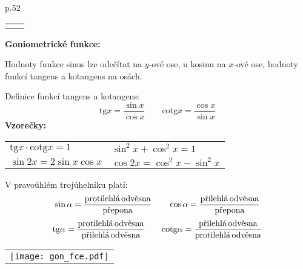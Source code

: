 \documentclass[10pt,a4paper]{article}
\newcommand{\nazv}[1]{{\large \textbf{\textsf{#1}}}}
\newcommand{\tg}{\mathrm{tg}}
\newcommand{\cotg}{\mathrm{cotg}}
\begin{document}
\vspace{-0.5cm}
\begin{tabular}{p{}}
\hspace{-0.2cm}\begin{tabular}{p{5cm}p{4.4cm}}\\

&\begin{footnotesize}
\end{footnotesize}
\end{tabular}

\nazv{Goniometrické funkce:}

Hodnoty funkce sinus lze odečítat na $y$-ové ose, u kosinu na $x$-ové ose, 
hodnoty funkcí tangens a kotangens na  osách.


Definice funkcí tangens a kotangens:
$$	\tg x=\frac{\sin x}{\cos x}\qquad\cotg x=\frac{\cos x}{\sin x} $$
\textbf{Vzorečky:}

\begin{tabular}{p{}p{}}$ \tg x \cdot\cotg x=1$&$ \sin^2 x+\cos^2 x=1$\\$ \sin 2x=2\sin x\cos x$&$\cos 2x=\cos^2 x - \sin^2 x $\\
\end{tabular}

V pravoúhlém trojúhelníku platí:
$$ \sin\alpha=\frac{\text{protilehlá\,odvěsna}}{\text{přepona}}\qquad \cos\alpha=\frac{\text{přilehlá\,odvěsna}}{\text{přepona}}$$
$$\tg\alpha=\frac{\text{protilehlá\,odvěsna}}{\text{přilehlá\,odvěsna}} \qquad\cotg\alpha=\frac{\text{přilehlá\,odvěsna}}{\text{protilehlá\,odvěsna}}$$


\end{tabular}
\begin{tabular}{l}
\texttt{[image: gon\_fce.pdf]}
\end{tabular}

\newpage
\end{document}
